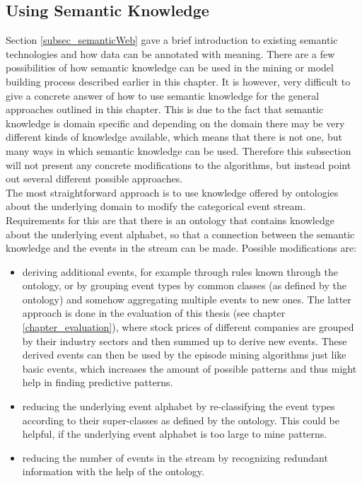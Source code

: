 \subsection{Using Semantic Knowledge}
\label{subsec_UsingSemantics}
Section \ref{subsec_semanticWeb} gave a brief introduction to existing semantic technologies and how data can be annotated with meaning. There are a few possibilities of how semantic knowledge can be used in the mining or model building process described earlier in this chapter. It is however, very difficult to give a concrete answer of how to use semantic knowledge for the general approaches outlined in this chapter. This is due to the fact that semantic knowledge is domain specific and depending on the domain there may be very different kinds of knowledge available, which means that there is not one, but many ways in which semantic knowledge can be used. Therefore this subsection will not present any concrete modifications to the algorithms, but instead point out several different possible approaches.\\
The most straightforward approach is to use knowledge offered by ontologies about the underlying domain to modify the categorical event stream. Requirements for this are that there is an ontology that contains knowledge about the underlying event alphabet, so that a connection between the semantic knowledge and the events in the stream can be made. Possible modifications are:

\begin{itemize}
	\item deriving additional events, for example through rules known through the ontology, or by grouping event types by common classes (as defined by the ontology) and somehow aggregating multiple events to new ones. The latter approach is done in the evaluation of this thesis (see chapter \ref{chapter_evaluation}), where stock prices of different companies are grouped by their industry sectors and then summed up to derive new events. These derived events can then be used by the episode mining algorithms just like basic events, which increases the amount of possible patterns and thus might help in finding predictive patterns.
	\item reducing the underlying event alphabet by re-classifying the event types according to their super-classes as defined by the ontology. This could be helpful, if the underlying event alphabet is too large to mine patterns.
	\item reducing the number of events in the stream by recognizing redundant information with the help of the ontology.
\end{itemize}

